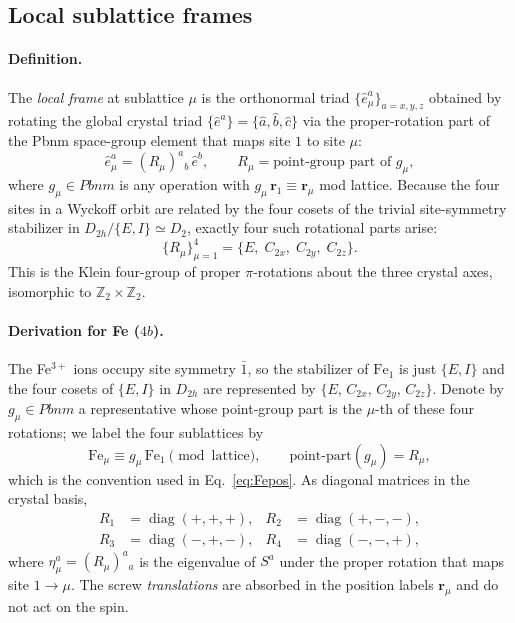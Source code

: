 \documentclass[reprint,amsmath,amssymb,aps,prb,longbibliography]{revtex4-2}
\newcommand{\bfr}{\mathbf{r}}
\DeclareMathOperator{\diag}{diag}
\begin{document}
\subsection{Local sublattice frames}
\label{sec:localframes}

\paragraph{Definition.} The \emph{local frame} at sublattice $\mu$ is
the orthonormal triad $\{\hat e^a_\mu\}_{a=x,y,z}$ obtained by rotating
the global crystal triad $\{\hat e^a\}=\{\hat a,\hat b,\hat c\}$ via the
proper-rotation part of the Pbnm space-group element that maps site $1$
to site $\mu$:
\begin{equation}
\hat e^a_\mu = (R_\mu)^a{}_b\,\hat e^b,\qquad
R_\mu = \text{point-group part of }g_\mu,
\label{eq:Rmudef}
\end{equation}
where $g_\mu\in Pbnm$ is any operation with $g_\mu\,\bfr_1 \equiv \bfr_\mu$
mod lattice. Because the four sites in a Wyckoff orbit are
related by the four cosets of the trivial site-symmetry stabilizer in
$D_{2h}/\{E,I\} \simeq D_2$, exactly four such rotational parts arise:
\begin{equation}
\{R_\mu\}_{\mu=1}^{4} = \{E,\;C_{2x},\;C_{2y},\;C_{2z}\}.
\label{eq:RmuKlein}
\end{equation}
This is the Klein four-group of proper $\pi$-rotations about the three
crystal axes, isomorphic to $\mathbb Z_2\times\mathbb Z_2$.

\paragraph{Derivation for Fe ($4b$).} The Fe$^{3+}$ ions occupy site
symmetry $\bar 1$, so the stabilizer of $\mathrm{Fe}_1$ is just
$\{E,I\}$ and the four cosets of $\{E,I\}$ in $D_{2h}$ are represented
by $\{E,\,C_{2x},\,C_{2y},\,C_{2z}\}$. Denote by $g_\mu\in Pbnm$ a
representative whose point-group part is the $\mu$-th of these four
rotations; we label the four sublattices by
\begin{equation}
\mathrm{Fe}_\mu \equiv g_\mu\,\mathrm{Fe}_1\!\!\!\pmod{\mathrm{lattice}},
\qquad \text{point-part}(g_\mu)=R_\mu,
\label{eq:FemapPbnm}
\end{equation}
which is the convention used in Eq.~\eqref{eq:Fepos}. As diagonal
matrices in the crystal basis,
\begin{equation}
\begin{aligned}
R_1&=\diag(+,+,+), & R_2&=\diag(+,-,-),\\
R_3&=\diag(-,+,-), & R_4&=\diag(-,-,+),
\end{aligned}
\label{eq:Rmu}
\end{equation}
where $\eta^a_\mu=(R_\mu)^a{}_a$ is the eigenvalue of $S^a$ under the
proper rotation that maps site $1\to\mu$. The screw \emph{translations}
are absorbed in the position labels $\bfr_\mu$ and do not act on the
spin.
\end{document}
